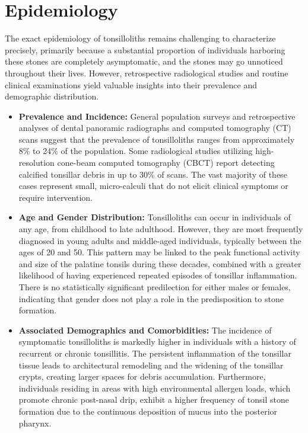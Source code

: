 \section*{Epidemiology}
The exact epidemiology of tonsilloliths remains challenging to characterize precisely, primarily because a substantial proportion of individuals harboring these stones are completely asymptomatic, and the stones may go unnoticed throughout their lives. However, retrospective radiological studies and routine clinical examinations yield valuable insights into their prevalence and demographic distribution.
\begin{itemize}
    \item \textbf{Prevalence and Incidence:} General population surveys and retrospective analyses of dental panoramic radiographs and computed tomography (CT) scans suggest that the prevalence of tonsilloliths ranges from approximately 8\% to 24\% of the population. Some radiological studies utilizing high-resolution cone-beam computed tomography (CBCT) report detecting calcified tonsillar debris in up to 30\% of scans. The vast majority of these cases represent small, micro-calculi that do not elicit clinical symptoms or require intervention.
    \item \textbf{Age and Gender Distribution:} Tonsilloliths can occur in individuals of any age, from childhood to late adulthood. However, they are most frequently diagnosed in young adults and middle-aged individuals, typically between the ages of 20 and 50. This pattern may be linked to the peak functional activity and size of the palatine tonsils during these decades, combined with a greater likelihood of having experienced repeated episodes of tonsillar inflammation. There is no statistically significant predilection for either males or females, indicating that gender does not play a role in the predisposition to stone formation.
    \item \textbf{Associated Demographics and Comorbidities:} The incidence of symptomatic tonsilloliths is markedly higher in individuals with a history of recurrent or chronic tonsillitis. The persistent inflammation of the tonsillar tissue leads to architectural remodeling and the widening of the tonsillar crypts, creating larger spaces for debris accumulation. Furthermore, individuals residing in areas with high environmental allergen loads, which promote chronic post-nasal drip, exhibit a higher frequency of tonsil stone formation due to the continuous deposition of mucus into the posterior pharynx.
\end{itemize}

